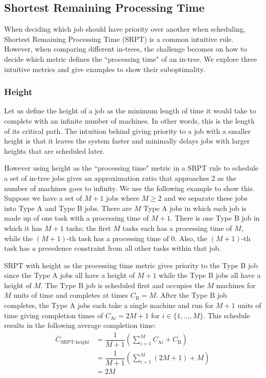 \subsection{Shortest Remaining Processing Time}
When deciding which job should have priority over another when scheduling, Shortest Remaining Processing Time (SRPT) is a common intuitive rule.
However, when comparing different in-trees, the challenge becomes on how to decide which metric defines the ``processing time" of an in-tree.
We explore three intuitive metrics and give examples to show their suboptimality.

\subsubsection{Height}

Let us define the height of a job as the minimum length of time it would take to complete with an infinite number of machines.
In other words, this is the length of its critical path.
The intuition behind giving priority to a job with a smaller height is that it leaves the system faster and minimally delays jobs with larger heights that are scheduled later.

However using height as the ``processing time" metric in a SRPT rule to schedule a set of in-tree jobs gives an approximation ratio that approaches 2 as the number of machines goes to infinity.
We use the following example to show this.
Suppose we have a set of $M+1$ jobs where $M\geq 2$ and we separate these jobs into Type A and Type B jobs.
There are $M$ Type A jobs in which each job is made up of one task with a processing time of $M+1$.
There is one Type B job in which it has $M+1$ tasks; the first $M$ tasks each has a processing time of $M$, while the $(M+1)$-th task has a processing time of 0.
Also, the $(M+1)$-th task has a precedence constraint from all other tasks within that job.

SRPT with height as the processing time metric gives priority to the Type B job since the Type A jobs all have a height of $M+1$ while the Type B jobs all have a height of $M$.
The Type B job is scheduled first and occupies the $M$ machines for $M$ units of time and completes at times $C_\text{B}=M$.
After the Type B job completes, the Type A jobs each take a single machine and run for $M+1$ units of time giving completion times of $C_{\text{A}i}=2M+1$ for $i\in\{1,...,M\}$.
This schedule results in the following average completion time:
\begin{align}
	\overline{C}_\text{SRPT-height} & = \dfrac{1}{M+1}\left(\sum_{i=1}^M C_{\text{A}i} + C_{\text{B}}\right) \nonumber \\
	& = \dfrac{1}{M+1}\left(\sum_{i=1}^M (2M+1) + M\right) \nonumber \\
	& = 2M 
\end{align}

